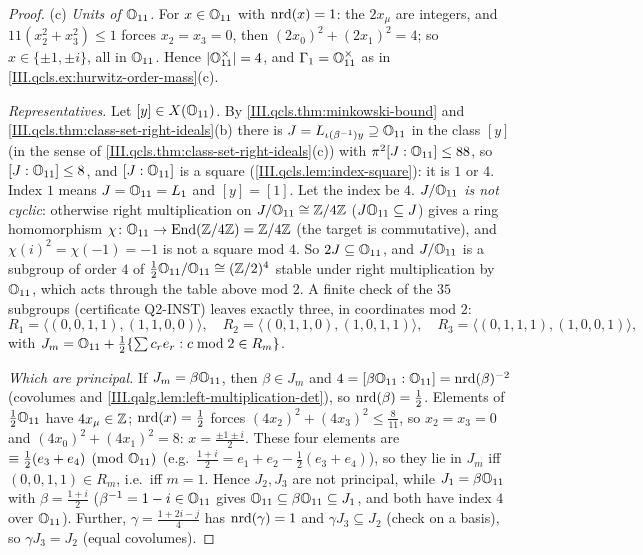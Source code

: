 \begin{proof}
(c) \emph{Units of $\mathbb{O}_{11}$.} For $x\in\mathbb{O}_{11}$ with $\operatorname{nrd}(x)=1$: the $2x_\mu$ are integers, and $11(x_2^2+x_3^2)\le1$ forces $x_2=x_3=0$, then
$(2x_0)^2+(2x_1)^2=4$; so $x\in\{\pm1,\pm i\}$, all in $\mathbb{O}_{11}$. Hence $\lvert\mathbb{O}_{11}^\times\rvert=4$, and $\Gamma_1=\mathbb{O}_{11}^\times$ as in
\cref{III.qcls.ex:hurwitz-order-mass}(c).

\emph{Representatives.} Let $[y]\in X(\mathbb{O}_{11})$. By \cref{III.qcls.thm:minkowski-bound} and \cref{III.qcls.thm:class-set-right-ideals}(b) there is
$J=L_{\iota(\beta^{-1})y}\supseteq\mathbb{O}_{11}$ in the class $[y]$ (in the sense of \cref{III.qcls.thm:class-set-right-ideals}(c)) with
$\pi^2[J:\mathbb{O}_{11}]\le88$, so $[J:\mathbb{O}_{11}]\le8$, and $[J:\mathbb{O}_{11}]$ is a square (\cref{III.qcls.lem:index-square}): it is $1$ or $4$. Index $1$ means
$J=\mathbb{O}_{11}=L_1$ and $[y]=[1]$. Let the index be $4$. \emph{$J/\mathbb{O}_{11}$ is not cyclic}: otherwise right multiplication on $J/\mathbb{O}_{11}\cong\mathbb{Z}/4\mathbb{Z}$
($J\mathbb{O}_{11}\subseteq J$) gives a ring homomorphism $\chi\colon\mathbb{O}_{11}\to\operatorname{End}(\mathbb{Z}/4\mathbb{Z})=\mathbb{Z}/4\mathbb{Z}$ (the target is commutative), and
$\chi(i)^2=\chi(-1)=-1$ is not a square mod $4$. So $2J\subseteq\mathbb{O}_{11}$, and $J/\mathbb{O}_{11}$ is a subgroup of order $4$ of
$\frac12\mathbb{O}_{11}/\mathbb{O}_{11}\cong(\mathbb{Z}/2)^4$ stable under right multiplication by $\mathbb{O}_{11}$, which acts through the table above mod $2$. A finite check of
the $35$ subgroups (certificate Q2-INST) leaves exactly three, in coordinates mod $2$:
\[
  R_1=\langle(0,0,1,1),(1,1,0,0)\rangle,\quad R_2=\langle(0,1,1,0),(1,0,1,1)\rangle,\quad R_3=\langle(0,1,1,1),(1,0,0,1)\rangle,
\]
with $J_m=\mathbb{O}_{11}+\frac12\{\sum c_re_r:c\bmod2\in R_m\}$.

\emph{Which are principal.} If $J_m=\beta\mathbb{O}_{11}$, then $\beta\in J_m$ and $4=[\beta\mathbb{O}_{11}:\mathbb{O}_{11}]=\operatorname{nrd}(\beta)^{-2}$ (covolumes and
\cref{III.qalg.lem:left-multiplication-det}), so $\operatorname{nrd}(\beta)=\frac12$. Elements of $\frac12\mathbb{O}_{11}$ have $4x_\mu\in\mathbb{Z}$; $\operatorname{nrd}(x)=\frac12$ forces
$(4x_2)^2+(4x_3)^2\le\frac8{11}$, so $x_2=x_3=0$ and $(4x_0)^2+(4x_1)^2=8$: $x=\frac{\pm1\pm i}2$. These four elements are $\equiv\frac12(e_3+e_4)\pmod{\mathbb{O}_{11}}$
(e.g.\ $\frac{1+i}2=e_1+e_2-\frac12(e_3+e_4)$), so they lie in $J_m$ iff $(0,0,1,1)\in R_m$, i.e.\ iff $m=1$. Hence $J_2,J_3$ are not principal, while
$J_1=\beta\mathbb{O}_{11}$ with $\beta=\frac{1+i}2$ ($\beta^{-1}=1-i\in\mathbb{O}_{11}$ gives $\mathbb{O}_{11}\subseteq\beta\mathbb{O}_{11}\subseteq J_1$, and both have index $4$ over
$\mathbb{O}_{11}$). Further, $\gamma=\frac{1+2i-j}4$ has $\operatorname{nrd}(\gamma)=1$ and $\gamma J_3\subseteq J_2$ (check on a basis), so $\gamma J_3=J_2$ (equal covolumes).


\end{proof}
